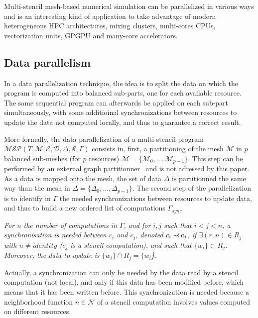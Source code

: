 Multi-stencil mesh-based numerical simulation can be parallelized in various ways and is an interesting kind of application to take advantage of modern heterogeneous HPC architectures, mixing clusters, multi-cores CPUs, vectorization units, GPGPU and many-core accelerators.

\subsection{Data parallelism}
\label{sect:dataparal}
In a data parallelization technique, the idea is to split the data on which the program is computed into balanced sub-parts, one for each available resource. The same sequential program can afterwards be applied on each sub-part simultaneously, with some additioinal synchronizations between resources to update the data not computed locally, and thus to guarantee a correct result.

More formally, the data parallelization of a multi-stencil program $\mathcal{MSP}(T,\mathcal{M},\mathcal{E},\mathcal{D},\Delta, \mathcal{S},\Gamma)$ consists in, first, a partitioning of the mesh $\mathcal{M}$ in $p$ balanced sub-meshes (for $p$ resources) $\mathcal{M}=\{\mathcal{M}_0,\dots,\mathcal{M}_{p-1}\}$. This step can be performed by an external graph partitionner~\cite{} and is not adressed by this paper. As a data is mapped onto the mesh, the set of data $\Delta$ is partitionned the same way than the mesh in $\Delta=\{\Delta_0,\dots,\Delta_{p-1}\}$. The second step of the parallelization is to identify in $\Gamma$ the needed synchronizations between resources to update data, and thus to build a new ordered list of computations $\Gamma_{sync}$.

\begin{mydef}
\textit{
For $n$ the number of computations in $\Gamma$, and for $i,j$ such that $i<j<n$, a \textit{synchronisation} is needed between $c_i$ and $c_j$, denoted $c_i \pprec c_j$, if $\exists (r,n) \in R_j$ with $n\neq identity$ ($c_j$ is a stencil computation), and such that $\{w_i\} \subset R_j$. Moreover, the data to update is $\{w_i\} \cap R_j = \{w_i$\}.}
\end{mydef}

Actually, a synchronization can only be needed by the data read by a stencil computation (not local), and only if this data has been modified before, which means that it has been written before. This synchronization is needed because a neighborhood function $n \in \mathcal{N}$ of a stencil computation involves values computed on different resources.

